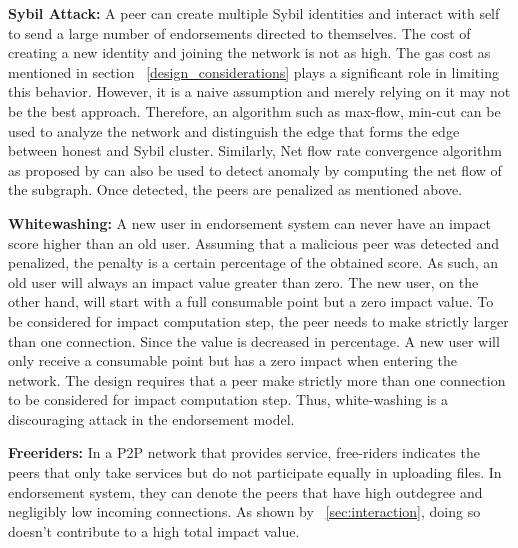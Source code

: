 \textbf{Sybil Attack:}
A peer can create multiple Sybil identities and interact with self to send a
large number of endorsements directed to themselves. The cost of creating a new
identity and joining the network is not as high.  The gas cost as mentioned in
section ~\ref{design_considerations} plays a significant role in limiting this
behavior. However, it is a naive assumption and merely relying on it may not be
the best approach.  Therefore, an algorithm such as max-flow, min-cut can be
used to analyze the network and distinguish the edge that forms the edge
between honest and Sybil cluster. Similarly, Net flow rate convergence
algorithm as proposed by \cite{buechler2015decentralized} can also be used to
detect anomaly by computing the net flow of the subgraph. Once detected, the
peers are penalized as mentioned above.

\textbf{Whitewashing:}
A new user in endorsement system can never have an impact score higher than an
old user. Assuming that a malicious peer was detected and penalized, the
penalty is a certain percentage of the obtained score. As such, an old user
will always an impact value greater than zero. The new user, on the other hand,
will start with a full consumable point but a zero impact value. To be
considered for impact computation step, the peer needs to make strictly larger
than one connection.  Since the value is decreased in percentage. A new user
will only receive a consumable point but has a zero impact when entering the
network. The design requires that a peer make strictly more than one connection
to be considered for impact computation step. Thus, white-washing is a
discouraging attack in the endorsement model.

\textbf{Freeriders:}
In a P2P network that provides service, free-riders indicates the peers that
only take services but do not participate equally in uploading files. In
endorsement system, they can denote the peers that have high outdegree and
negligibly low incoming connections. As shown by ~\ref{sec:interaction}, doing
so doesn't contribute to a high total impact value.

